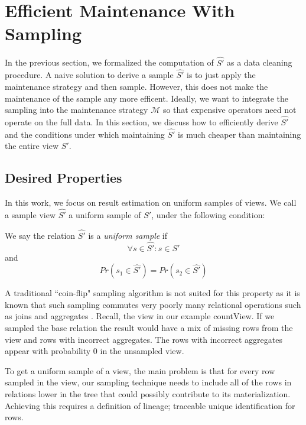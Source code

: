 \section{Efficient Maintenance With Sampling}
In the previous section, we formalized the computation of $\hat{S'}$  as a data cleaning procedure.
A naive solution to derive a sample $\hat{S'}$ is to just apply the maintenance strategy and then sample.
However, this does not make the maintenance of the sample any more efficent.
Ideally, we want to integrate the sampling into the maintenance strategy $\mathcal{M}$ so that expensive operators
need not operate on the full data.
In this section, we discuss how to efficiently derive $\hat{S'}$ and the conditions under which
maintaining $\hat{S'}$ is much cheaper than maintaining the entire view $S'$.

\subsection{Desired Properties}
In this work, we focus on result estimation on uniform samples of views.
We call a sample view $\hat{S'}$ a uniform sample of $S'$, under the following condition:
\begin{definition} We say the relation $\hat{S'}$ is a \emph{uniform sample} if
\[ \forall s \in \hat{S'} : s \in S' \]
and
\[Pr(s_1 \in \hat{S'}) =  Pr(s_2 \in \hat{S'}) \]
\end{definition}
A traditional ``coin-flip" sampling algorithm is not suited for this property as it is known that such sampling commutes very poorly many relational operations such as joins and aggregates \cite{chaudhuri1999random}.
Recall, the view in our example \textsf{countView}. 
If we sampled the base relation the result would have a mix of missing rows from the view and rows with incorrect aggregates.
The rows with incorrect aggregates appear with probability 0 in the unsampled view.

To get a uniform sample of a view, the main problem is that for every row sampled in the view, our sampling technique needs to include all of the rows in relations lower in the tree that could possibly contribute to its materialization.
Achieving this requires a definition of lineage; traceable unique identification for rows.

